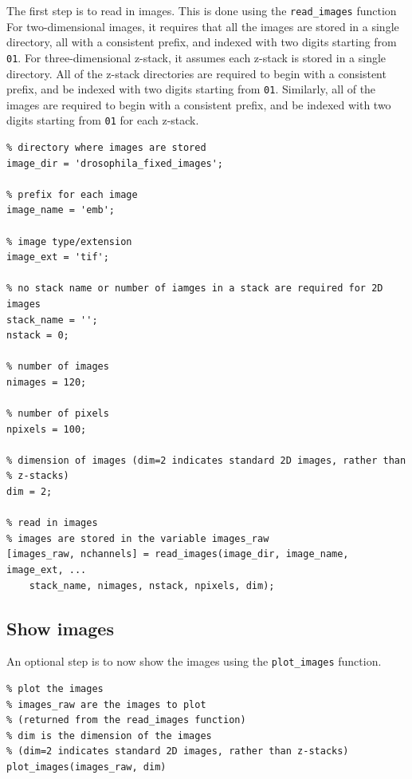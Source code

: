\documentclass[12pt]{article}
\begin{document}
\begin{par}
The first step is to read in images. This is done using the \texttt{read\_images} function For two-dimensional images, it requires that all the images are stored in a single directory, all with a consistent prefix, and indexed with two digits starting from \texttt{01}. For three-dimensional z-stack, it assumes each z-stack is stored in a single directory. All of the z-stack directories are required to begin with a consistent prefix, and be indexed with two digits starting from \texttt{01}. Similarly, all of the images are required to begin with a consistent prefix, and be indexed with two digits starting from \texttt{01} for each z-stack.
\end{par} \vspace{1em}
\begin{verbatim}
% directory where images are stored
image_dir = 'drosophila_fixed_images';

% prefix for each image
image_name = 'emb';

% image type/extension
image_ext = 'tif';

% no stack name or number of iamges in a stack are required for 2D images
stack_name = '';
nstack = 0;

% number of images
nimages = 120;

% number of pixels
npixels = 100;

% dimension of images (dim=2 indicates standard 2D images, rather than
% z-stacks)
dim = 2;

% read in images
% images are stored in the variable images_raw
[images_raw, nchannels] = read_images(image_dir, image_name, image_ext, ...
    stack_name, nimages, nstack, npixels, dim);
\end{verbatim}


\subsection*{Show images}

\begin{par}
An optional step is to now show the images using the \texttt{plot\_images} function.
\end{par} \vspace{1em}
\begin{verbatim}
% plot the images
% images_raw are the images to plot
% (returned from the read_images function)
% dim is the dimension of the images
% (dim=2 indicates standard 2D images, rather than z-stacks)
plot_images(images_raw, dim)
\end{verbatim}
\end{document}

